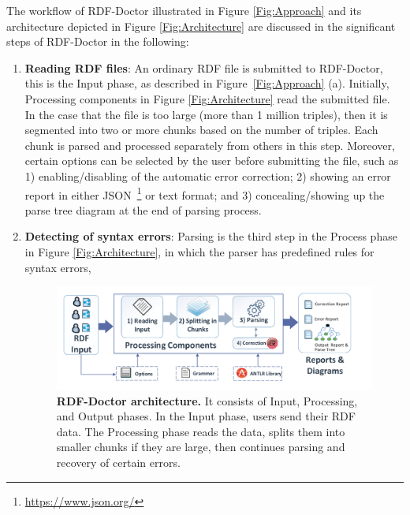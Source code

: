 The workflow of RDF-Doctor illustrated in Figure \ref{Fig:Approach} and its architecture depicted in Figure \ref{Fig:Architecture} are discussed in the significant steps of RDF-Doctor in the following:

 \begin{enumerate}[label=(\alph*)]
\item \textbf{Reading RDF files}: An ordinary RDF file is submitted to RDF-Doctor, this is the Input phase, as described in Figure~\ref{Fig:Approach} (a).
Initially, Processing components in Figure \ref{Fig:Architecture} read the submitted file. In the case that the file is too large (more than 1 million triples), then it is segmented into two or more chunks based on the number of triples. 
Each chunk is parsed and processed separately from others in this step.
Moreover, certain options can be selected by the user before submitting the file, such as 1) enabling/disabling of the automatic error correction; 2) showing an error report in either  JSON~\footnote{\url{https://www.json.org/}} or text format; and 3) concealing/showing up the parse tree diagram at the end of parsing process.
\item \textbf{Detecting of syntax errors}: Parsing is the third step in  the Process phase in Figure \ref{Fig:Architecture}, in which the parser has predefined rules for syntax errors,  %
\begin{figure}[ht]
	\begin{center}
		\includegraphics[scale=0.5]{images/architecture.pdf}
	\caption{\textbf{RDF-Doctor architecture.} It consists of Input, Processing, and Output phases. 
		In the Input phase, users send their RDF data. The Processing phase reads the data, splits them into smaller chunks if they are large, then continues parsing and recovery of certain errors.
}
\end{center}
\end{figure}
\end{enumerate}
